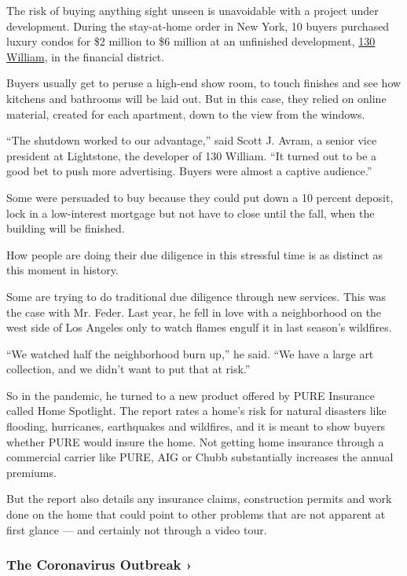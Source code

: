 The risk of buying anything sight unseen is unavoidable with a project
under development. During the stay-at-home order in New York, 10 buyers
purchased luxury condos for \$2 million to \$6 million at an unfinished
development, \href{https://130william.com/}{130 William}, in the
financial district.

Buyers usually get to peruse a high-end show room, to touch finishes and
see how kitchens and bathrooms will be laid out. But in this case, they
relied on online material, created for each apartment, down to the view
from the windows.

``The shutdown worked to our advantage,'' said Scott J. Avram, a senior
vice president at Lightstone, the developer of 130 William. ``It turned
out to be a good bet to push more advertising. Buyers were almost a
captive audience.''

Some were persuaded to buy because they could put down a 10 percent
deposit, lock in a low-interest mortgage but not have to close until the
fall, when the building will be finished.

How people are doing their due diligence in this stressful time is as
distinct as this moment in history.

Some are trying to do traditional due diligence through new services.
This was the case with Mr. Feder. Last year, he fell in love with a
neighborhood on the west side of Los Angeles only to watch flames engulf
it in last season's wildfires.

``We watched half the neighborhood burn up,'' he said. ``We have a large
art collection, and we didn't want to put that at risk.''

So in the pandemic, he turned to a new product offered by PURE Insurance
called Home Spotlight. The report rates a home's risk for natural
disasters like flooding, hurricanes, earthquakes and wildfires, and it
is meant to show buyers whether PURE would insure the home. Not getting
home insurance through a commercial carrier like PURE, AIG or Chubb
substantially increases the annual premiums.

But the report also details any insurance claims, construction permits
and work done on the home that could point to other problems that are
not apparent at first glance --- and certainly not through a video tour.

\href{https://www.nytimes.com/news-event/coronavirus?action=click\&pgtype=Article\&state=default\&region=MAIN_CONTENT_3\&context=storylines_faq}{}

\hypertarget{the-coronavirus-outbreak-}{%
\subsubsection{The Coronavirus Outbreak
›}\label{the-coronavirus-outbreak-}}

